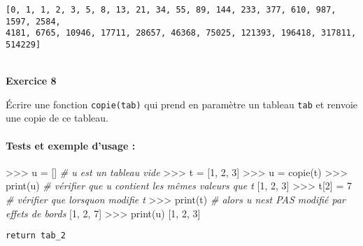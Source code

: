 \documentclass[a4paper,17pt]{extarticle}
\newenvironment{eleve}%
{\begin{activite}\color{noiramu}\\[-0.5cm]}
{\end{activite}}
\newenvironment{Shaded}{}{}
\newcommand{\DecValTok}[1]{\textcolor[rgb]{0.25,0.63,0.44}{{#1}}}
\newcommand{\CommentTok}[1]{\textcolor[rgb]{0.38,0.63,0.69}{\textit{{#1}}}}
\newcommand{\NormalTok}[1]{{#1}}
\newcommand{\OperatorTok}[1]{\textcolor[rgb]{0.40,0.40,0.40}{{#1}}}
\newcommand{\BuiltInTok}[1]{{#1}}
\begin{document}
    \begin{Verbatim}[commandchars=\\\{\}]
[0, 1, 1, 2, 3, 5, 8, 13, 21, 34, 55, 89, 144, 233, 377, 610, 987, 1597, 2584,
4181, 6765, 10946, 17711, 28657, 46368, 75025, 121393, 196418, 317811, 514229]
    \end{Verbatim}
\begin{eleve}
    \textbf{Exercice 8}

Écrire une fonction \texttt{copie(tab)} qui prend en paramètre un
tableau \texttt{tab} et renvoie une copie de ce tableau.

\hypertarget{tests-et-exemple-dusage}{%
\paragraph{Tests et exemple d'usage :}\label{tests-et-exemple-dusage}}

\begin{Shaded}
\begin{Highlighting}[]
\OperatorTok{\textgreater{}\textgreater{}\textgreater{}}\NormalTok{ u }\OperatorTok{=}\NormalTok{ []          }\CommentTok{\# u est un tableau vide}
\OperatorTok{\textgreater{}\textgreater{}\textgreater{}}\NormalTok{ t }\OperatorTok{=}\NormalTok{ [}\DecValTok{1}\NormalTok{, }\DecValTok{2}\NormalTok{, }\DecValTok{3}\NormalTok{]}
\OperatorTok{\textgreater{}\textgreater{}\textgreater{}}\NormalTok{ u }\OperatorTok{=}\NormalTok{ copie(t)}
\OperatorTok{\textgreater{}\textgreater{}\textgreater{}} \BuiltInTok{print}\NormalTok{(u)        }\CommentTok{\# vérifier que u contient les mêmes valeurs que t}
\NormalTok{[}\DecValTok{1}\NormalTok{, }\DecValTok{2}\NormalTok{, }\DecValTok{3}\NormalTok{]}
\OperatorTok{\textgreater{}\textgreater{}\textgreater{}}\NormalTok{ t[}\DecValTok{2}\NormalTok{] }\OperatorTok{=} \DecValTok{7}        \CommentTok{\# vérifier que lorsqu\textquotesingle{}on modifie t}
\OperatorTok{\textgreater{}\textgreater{}\textgreater{}} \BuiltInTok{print}\NormalTok{(t)        }\CommentTok{\#   alors u n\textquotesingle{}est PAS modifié par effets de bords}
\NormalTok{[}\DecValTok{1}\NormalTok{, }\DecValTok{2}\NormalTok{, }\DecValTok{7}\NormalTok{]}
\OperatorTok{\textgreater{}\textgreater{}\textgreater{}} \BuiltInTok{print}\NormalTok{(u)}
\NormalTok{[}\DecValTok{1}\NormalTok{, }\DecValTok{2}\NormalTok{, }\DecValTok{3}\NormalTok{]}
\end{Highlighting}
\end{Shaded}

\begin{verbatim}
return tab_2
\end{verbatim}
        
        \end{eleve}
\end{document}
